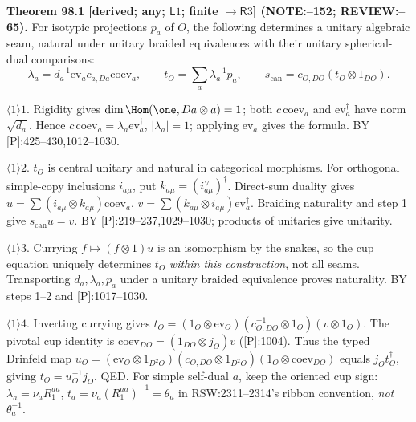 \textbf{Theorem 98.1 [derived; any; \(\mathsf L1\); finite \(\to\mathsf R3\)] (NOTE:--152; REVIEW:--65).}
For isotypic projections \(p_a\) of \(O\), the following determines a unitary algebraic seam, natural under
unitary braided equivalences with their unitary spherical-dual comparisons:
\begin{equation}\label{eq:98-canonical}
 \lambda_a=d_a^{-1}\mathrm{ev}_a c_{a,Da}\mathrm{coev}_a,\qquad
 t_O=\sum_a\lambda_a^{-1}p_a,\qquad s_{\mathrm{can}}=c_{O,DO}(t_O\otimes1_{DO}).
\end{equation}
\par\(\langle1\rangle1\). Rigidity gives \(\dim\Hom(\one,Da\otimes a)=1\); both \(c\,\mathrm{coev}_a\) and
\(\mathrm{ev}_a^\dagger\) have norm \(\sqrt{d_a}\). Hence \(c\,\mathrm{coev}_a=\lambda_a\mathrm{ev}_a^\dagger\),
\(|\lambda_a|=1\); applying \(\mathrm{ev}_a\) gives the formula. BY [P]:425--430,1012--1030.
\par\(\langle1\rangle2\). \(t_O\) is central unitary and natural in categorical morphisms. For orthogonal simple-copy
inclusions \(i_{a\mu}\), put \(k_{a\mu}=(i_{a\mu}^\vee)^\dagger\). Direct-sum duality gives
\(u=\sum(i_{a\mu}\otimes k_{a\mu})\mathrm{coev}_a\),
\(v=\sum(k_{a\mu}\otimes i_{a\mu})\mathrm{ev}_a^\dagger\). Braiding naturality and step 1 give \(s_{\mathrm{can}}u=v\).
BY [P]:219--237,1029--1030; products of unitaries give unitarity.
\par\(\langle1\rangle3\). Currying \(f\mapsto(f\otimes1)u\) is an isomorphism by the snakes, so the cup equation
uniquely determines \(t_O\) \emph{within this construction}, not all seams. Transporting \(d_a,\lambda_a,p_a\) under
a unitary braided equivalence proves naturality. BY steps 1--2 and [P]:1017--1030.
\par\(\langle1\rangle4\). Inverting currying gives
\(t_O=(1_O\otimes\mathrm{ev}_O)(c_{O,DO}^{-1}\otimes1_O)(v\otimes1_O)\).
The pivotal cup identity is \(\mathrm{coev}_{DO}=(1_{DO}\otimes j_O)v\) ([P]:1004). Thus the typed Drinfeld map
\(u_O=(\mathrm{ev}_O\otimes1_{D^2O})(c_{O,DO}\otimes1_{D^2O})(1_O\otimes\mathrm{coev}_{DO})\)
equals \(j_Ot_O^\dagger\), giving \(t_O=u_O^{-1}j_O\). QED.
For simple self-dual \(a\), keep the oriented cup sign: \(\lambda_a=\nu_aR_1^{aa}\),
\(t_a=\nu_a(R_1^{aa})^{-1}=\theta_a\) in RSW:2311--2314's ribbon convention, \emph{not} \(\theta_a^{-1}\).

